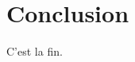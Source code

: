 \documentclass[french,nochapter,11pt]{rapportUB}
\begin{document}
\clearpage

\section{Conclusion}
\label{sec:conclusion}
C'est la fin.

\clearpage



\end{document}
